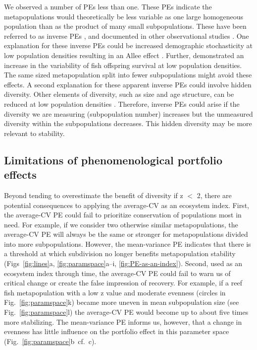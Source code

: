 We observed a number of PEs less than one. These PEs indicate the
metapopulations would theoretically be less variable as one large homogeneous
population than as the product of many small subpopulations. These have been
referred to as inverse PEs \citep{thibaut2012}, and documented in other
observational studies \citep{deClerck2006}.
One explanation for these inverse PEs could be increased
demographic stochasticity at low population densities resulting in an Allee
effect \citep{allee1931}. Further, \citet{minto2008} demonstrated an
increase in the variability of fish offspring survival at low population
densities. The same sized metapopulation split into fewer subpopulations might
avoid these effects. A second explanation for these apparent inverse PEs
could involve hidden diversity. Other elements of diversity, such as size and
age structure, can be reduced at low population densities
\citep[e.g.][]{hutchings1993}. Therefore, inverse PEs could arise if the
diversity we are measuring (subpopulation number) increases but the unmeasured
diversity within the subpopulations decreases. This hidden diversity may be
more relevant to stability.

\subsection{Limitations of phenomenological portfolio effects}

Beyond tending to overestimate the benefit of diversity if z $<$ 2, there are
potential consequences to applying the average-CV as an ecosystem index. First,
the average-CV PE could fail to prioritize conservation of populations most in
need. For example, if we consider two otherwise similar metapopulations, the
average-CV PE will always be the same or stronger for metapopulations divided
into more subpopulations. However, the mean-variance PE indicates that there is
a threshold at which subdivision no longer benefits metapopulation stability
(Figs~\ref{fig:lines}a, \ref{fig:paramspace}a--i, \ref{fig:PE-as-an-index}).
Second, used as an ecosystem index through time, the average-CV PE could fail to
warn us of critical change or create the false impression of recovery. For
example, if a reef fish metapopulation with a low z value and moderate evenness
(circles in Fig.~\ref{fig:paramspace}k) became more uneven in mean subpopulation
size (see Fig.~\ref{fig:paramspace}l) the average-CV PE would become up to about
five times more stabilizing. The mean-variance PE informs us, however, that a
change in evenness has little influence on the portfolio effect in this
parameter space (Fig.~\ref{fig:paramspace}b~cf.~c).

